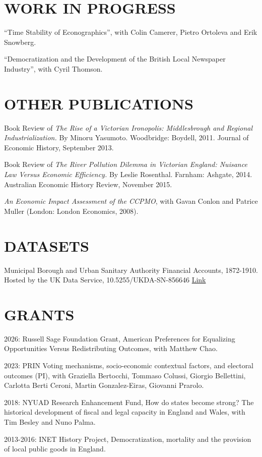 \documentclass{res}  %
\begin{document}
\begin{resume}
\section{WORK IN PROGRESS}
``Time Stability of Econographics'', with Colin Camerer, Pietro Ortoleva and Erik Snowberg.

``Democratization and the Development of the British Local Newspaper Industry'', with Cyril Thomson.

\section{OTHER PUBLICATIONS}
Book Review of \textit{The Rise of a Victorian Ironopolis: Middlesbrough and Regional Industrialization.} By Minoru Yasumoto. Woodbridge: Boydell, 2011. Journal of Economic History, September 2013. 

Book Review of \textit{The River Pollution Dilemma in Victorian England: Nuisance Law Versus Economic Efficiency.} By Leslie Rosenthal. Farnham: Ashgate, 2014. Australian Economic History Review, November 2015.

\textit{An Economic Impact Assessment of the CCPMO}, with Gavan Conlon and Patrice Muller (London: London Economics, 2008).

\section{DATASETS}
Municipal Borough and Urban Sanitary Authority Financial Accounts, 1872-1910. Hosted by the UK Data Service, 10.5255/UKDA-SN-856646 \href{https://reshare.ukdataservice.ac.uk/856646/}{Link}


\section{GRANTS}
2026: Russell Sage Foundation Grant, American Preferences for Equalizing Opportunities Versus Redistributing Outcomes, with Matthew Chao.

2023: PRIN Voting mechanisms, socio-economic contextual factors, and electoral outcomes (PI), with Graziella Bertocchi, Tommaso Colussi, Giorgio Bellettini, Carlotta Berti Ceroni, Martin Gonzalez-Eiras, Giovanni Prarolo.

2018: NYUAD Research Enhancement Fund, How do states become strong? The historical development of fiscal and legal capacity in England and Wales, with Tim Besley and Nuno Palma. 

2013-2016: INET History Project, Democratization, mortality and the provision of local public goods in England.


\end{resume}
\end{document}
